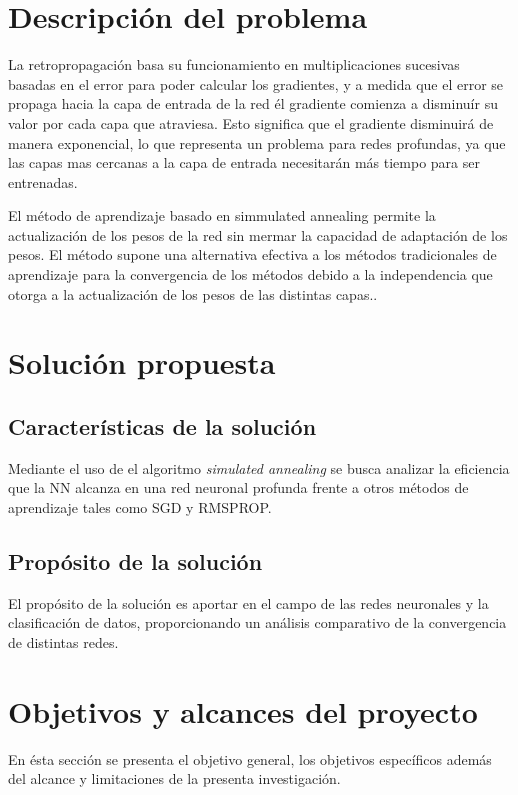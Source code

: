 \section{Descripción del problema}
La retropropagación basa su funcionamiento en multiplicaciones sucesivas basadas en el error para poder calcular los gradientes, y a medida que el error se propaga hacia la capa de entrada de la red él gradiente comienza a disminuír su valor por cada capa que atraviesa. Esto significa que el gradiente disminuirá de manera exponencial, lo que representa un problema para redes profundas, ya que las capas mas cercanas a la capa de entrada necesitarán más tiempo para ser entrenadas.

El método de aprendizaje basado en simmulated annealing permite la actualización de los pesos de la red sin mermar la capacidad de adaptación de los pesos. El método supone una alternativa efectiva a los métodos tradicionales de aprendizaje para la convergencia de los métodos debido a la independencia que otorga a la actualización de los pesos de las distintas capas..


\section{Solución propuesta}
\subsection{Características de la solución}
Mediante el uso de el algoritmo {\em simulated annealing} se busca analizar la eficiencia que la NN alcanza en una red neuronal profunda frente a otros métodos de aprendizaje tales como SGD y RMSPROP.

\subsection{Propósito de la solución}
El propósito de la solución es aportar en el campo de las redes neuronales y la clasificación de datos, proporcionando un análisis comparativo de la convergencia de distintas redes.

\section{Objetivos y alcances del proyecto}
En ésta sección se presenta el objetivo general, los objetivos específicos además del alcance y limitaciones de la presenta investigación.

